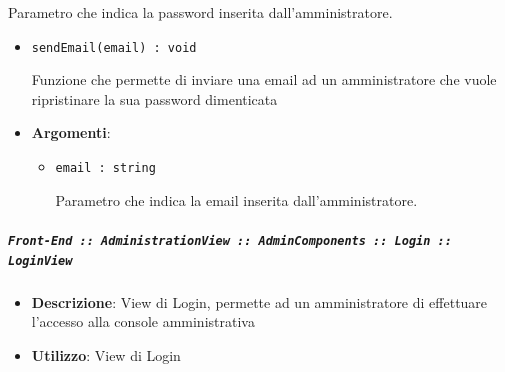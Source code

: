 \documentclass[../DefinizioneDiProdotto.tex]{subfiles}
\begin{document}
\begin{itemize}
\begin{itemize}
\begin{itemize}
\begin{itemize}
	 Parametro che indica la password inserita dall'amministratore.
	\end{itemize}
	\end{itemize}\vspace{0.5em}
	\begin{itemize}
	\item \texttt{sendEmail(email) : void}\

	 Funzione che permette di inviare una email ad un amministratore che vuole ripristinare la sua password dimenticata

	\item \textbf{Argomenti}:
	\begin{itemize}
	\item \texttt{email : string}\

	 Parametro che indica la email inserita dall'amministratore.
	\end{itemize}
	\end{itemize}\vspace{0.5em}
	\end{itemize}

	\subparagraph{\texttt{Front-End :: AdministrationView :: AdminComponents :: Login :: LoginView}}
	\begin{itemize}\item \textbf{Descrizione}: View di Login, permette ad un amministratore di effettuare l'accesso alla console amministrativa
	\item \textbf{Utilizzo}: View di Login
	\end{itemize}\end{itemize}

	\newpage
\end{document}
